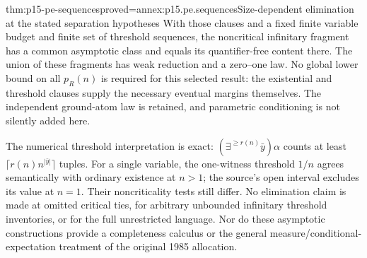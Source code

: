 \begin{hbtheorem}{thm:p15-pe-sequences}{proved=annex:p15.pe.sequences}{Size-dependent elimination at the stated separation hypotheses}
With those clauses and a fixed finite variable budget and finite set of
threshold sequences, the noncritical infinitary fragment has a common
asymptotic class and equals its quantifier-free content there.
The union of these fragments has weak reduction and a zero--one law.
No global lower bound on all \(p_R(n)\) is required for this selected
result: the existential and threshold clauses supply the necessary
eventual margins themselves. The independent ground-atom law is
retained, and parametric conditioning is not silently added here.
\end{hbtheorem}

The numerical threshold interpretation is exact:
\((\exists^{\ge r(n)}\bar y)\alpha\) counts at least
\(\lceil r(n)n^{|\bar y|}\rceil\) tuples. For a single variable,
the one-witness threshold \(1/n\) agrees semantically with ordinary
existence at \(n>1\); the source's open interval excludes its value at
\(n=1\). Their noncriticality tests still differ. No elimination claim
is made at omitted critical ties, for arbitrary unbounded infinitary
threshold inventories, or for the full unrestricted language.
Nor do these asymptotic constructions provide a completeness calculus
or the general measure/conditional-expectation treatment of the
original 1985 allocation.
